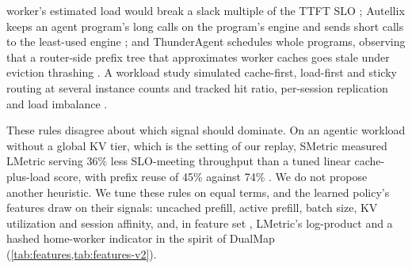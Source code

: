 worker's estimated load would break a slack multiple of the TTFT SLO \citep{wang2026smetric};
Autellix keeps an agent program's long calls on the program's engine and sends short calls to
the least-used engine \citep{luo2025autellix};
and ThunderAgent schedules whole programs, observing that a router-side prefix tree that
approximates worker caches goes stale under eviction thrashing \citep{kang2026thunderagent}.
A workload study simulated cache-first, load-first and sticky routing at several instance counts
and tracked hit ratio, per-session replication and load imbalance \citep{nixon2026year}.

These rules disagree about which signal should dominate. On an agentic workload without a global
KV tier, which is the setting of our replay, SMetric measured LMetric serving 36\% less
SLO-meeting throughput than a tuned linear cache-plus-load score, with prefix reuse of 45\%
against 74\% \citep{wang2026smetric}. We do not propose another heuristic. We tune these rules on
equal terms, and the learned policy's features draw on their signals: uncached prefill, active
prefill, batch size, KV utilization and session affinity, and, in feature set , LMetric's
log-product and a hashed home-worker indicator in the spirit of DualMap
(\cref{tab:features,tab:features-v2}).

